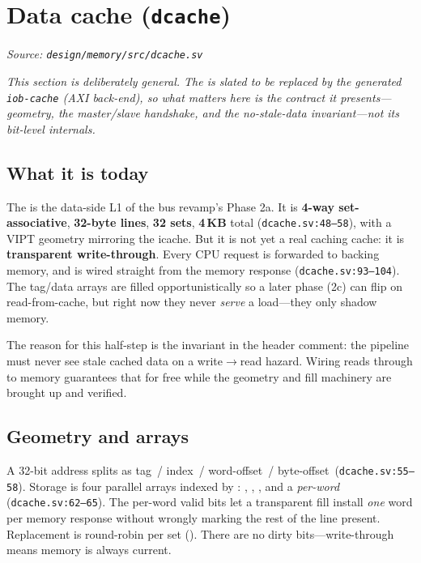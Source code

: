 \section{Data cache (\texttt{dcache})}
\textit{Source: \texttt{design/memory/src/dcache.sv}}

\noindent\emph{This section is deliberately general. The  is slated to
be replaced by the generated \texttt{iob-cache} (AXI back-end), so what matters here
is the \emph{contract} it presents---geometry, the master/slave handshake, and the
no-stale-data invariant---not its bit-level internals.}

\subsection{What it is today}
The  is the data-side L1 of the bus revamp's Phase 2a. It is
\textbf{4-way set-associative}, \textbf{32-byte lines}, \textbf{32 sets},
\textbf{4\,KB} total (\texttt{dcache.sv:48--58}), with a VIPT geometry mirroring the
icache. But it is not yet a real caching cache: it is \textbf{transparent
write-through}. Every CPU request is forwarded to backing memory, and
 is wired straight from the memory response
(\texttt{dcache.sv:93--104}). The tag/data arrays are filled opportunistically so a
later phase (2c) can flip on read-from-cache, but right now they never \emph{serve}
a load---they only shadow memory.

The reason for this half-step is the invariant in the header comment: the pipeline
must never see stale cached data on a write$\rightarrow$read hazard. Wiring reads
through to memory guarantees that for free while the geometry and fill machinery are
brought up and verified.


\subsection{Geometry and arrays}
A 32-bit address splits as tag\,\sig{[31:10]} / index\,\sig{[9:5]} /
word-offset\,\sig{[4:2]} / byte-offset\,\sig{[1:0]} (\texttt{dcache.sv:55--58}).
Storage is four parallel arrays indexed by \sig{[way][set]}: ,
, , and a \emph{per-word} 
(\texttt{dcache.sv:62--65}). The per-word valid bits let a transparent fill install
\emph{one} word per memory response without wrongly marking the rest of the line
present. Replacement is round-robin per set (). There are no
dirty bits---write-through means memory is always current.

